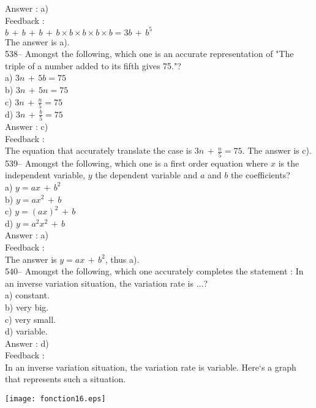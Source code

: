 ﻿\documentclass[letterpaper, 12pt]{article}
\begin{document}
Answer : a)\\

Feedback : \\
$b\,+\,b\,+\,b\,+\,b\times b\times b \times b \times b= 3b\,+\,b^{5}$\\
The answer is a).\\

538-- 
Amongst the following, which one is an accurate representation of "The triple of a number added to its fifth gives 75."?\\
a) $3n\,+\,5b=75$\\[2mm]
b) $3n\,+\,5n=75$\\[2mm]
c) $3n\,+\,\frac{n}{5}=75$\\[2mm]
d) $3n\,+\,\frac{b}{5}=75$\\

Answer : c)\\

Feedback : \\
The equation that accurately translate the case is $3n\,+\,\frac{n}{5}=75$.
The answer is c).\\


539-- Amongst the following, which one is a first order equation where $x$ is the independent variable, $y$ the dependent variable and $a$ and $b$ the coefficients?\\
a) $y=ax\,+\,b^{2}$ \\
b) $y=ax^{2}\,+\,b$\\
c) $y=\left( ax\right) ^{2}\,+\,b$\\
d) $y=a^{2}x^{2}\,+\,b$\\

Answer : a)\\

Feedback : \\
The answer is $y=ax\,+\,b^{2}$, thus a). \\

540-- Amongst the following, which one accurately completes the statement : \og In an inverse variation situation, the variation rate is $\ldots$\fg ?\\
a) constant.\\
b) very big.\\
c) very small.\\
d) variable.\\

Answer : d)\\

Feedback : \\
In an inverse variation situation, the variation rate is variable.
Here`s a graph that represents such a situation.\\
    \begin{center}
    \texttt{[image: fonction16.eps]}
    \end{center}
\end{document}

